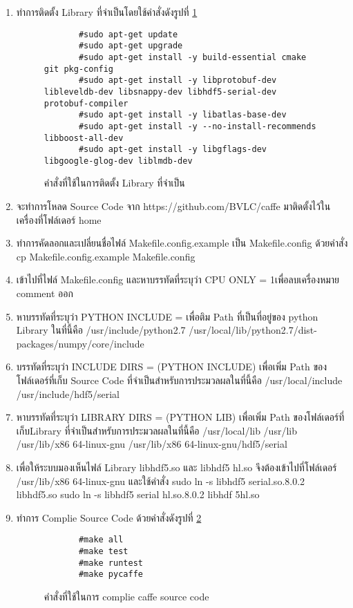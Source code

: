   \begin{enumerate}
    
  \item ทำการติดตั้ง Library ที่จำเป็นโดยใช้คำสั่งดังรูปที่ \ref{caffe1}
    \begin{figure}[t]
\begin{lstlisting}
       #sudo apt-get update
       #sudo apt-get upgrade
       #sudo apt-get install -y build-essential cmake git pkg-config
       #sudo apt-get install -y libprotobuf-dev libleveldb-dev libsnappy-dev libhdf5-serial-dev protobuf-compiler
       #sudo apt-get install -y libatlas-base-dev 
       #sudo apt-get install -y --no-install-recommends libboost-all-dev
       #sudo apt-get install -y libgflags-dev libgoogle-glog-dev liblmdb-dev	
\end{lstlisting}
\caption{คำสั่งที่ใช้ในการติดตั้ง Library ที่จำเป็น}
\label{caffe1}
\hrulefill
  \end{figure}
  \item จะทำการโหลด Source Code จาก {https://github.com/BVLC/caffe} มาติดตั้งไว้ในเครื่องที่โฟล์เดอร์ {home}
  \item ทำการคัดลอกและเปลี่ยนชื่อไฟล์ Makefile.config.example เป็น Makefile.config ด้วยคำสั่ง
    cp Makefile.config.example Makefile.config
  \item เข้าไปที่ไฟล์  Makefile.config และหาบรรทัดที่ระบุว่า CPU ONLY = 1เพื่อลบเครื่องหมาย comment ออก
  \item หาบรรทัดที่ระบุว่า PYTHON INCLUDE = เพื่อติม Path ที่เป็นที่อยู่ของ python Library ในที่นี้คือ
    /usr/include/python2.7 /usr/local/lib/python2.7/dist-packages/numpy/core/include
  \item บรรทัดที่ระบุว่า INCLUDE DIRS = (PYTHON INCLUDE) เพื่อเพิ่ม Path ของโฟล์เดอร์ที่เก็บ Source Code ที่จำเป็นสำหรับการประมวลผลในที่นี้คือ
    /usr/local/include /usr/include/hdf5/serial
  \item หาบรรทัดที่ระบุว่า LIBRARY DIRS = (PYTHON LIB) เพื่อเพิ่ม Path ของโฟล์เดอร์ที่เก็บLibrary ที่จำเป็นสำหรับการประมวลผลในที่นี้คือ
    /usr/local/lib /usr/lib /usr/lib/x86 64-linux-gnu /usr/lib/x86 64-linux-gnu/hdf5/serial
  \item เพื่อให้ระบบมองเห็นไฟล์ Library libhdf5.so และ libhdf5 hl.so จึงต้องเข้าไปที่โฟล์เดอร์ /usr/lib/x86 64-linux-gnu และใช้คำสั่ง
    sudo ln -s libhdf5 serial.so.8.0.2 libhdf5.so
    sudo ln -s libhdf5 serial hl.so.8.0.2 libhdf 5hl.so
  \item ทำการ Complie Source Code ด้วยคำสั่งดังรูปที่ \ref{caffe2}
   \begin{figure}[t]
\begin{lstlisting}
       #make all
       #make test
       #make runtest
       #make pycaffe	
\end{lstlisting}
\caption{คำสั่งที่ใช้ในการ complie caffe source code}
\label{caffe2}
\hrulefill
   \end{figure}
   
  \end{enumerate}
